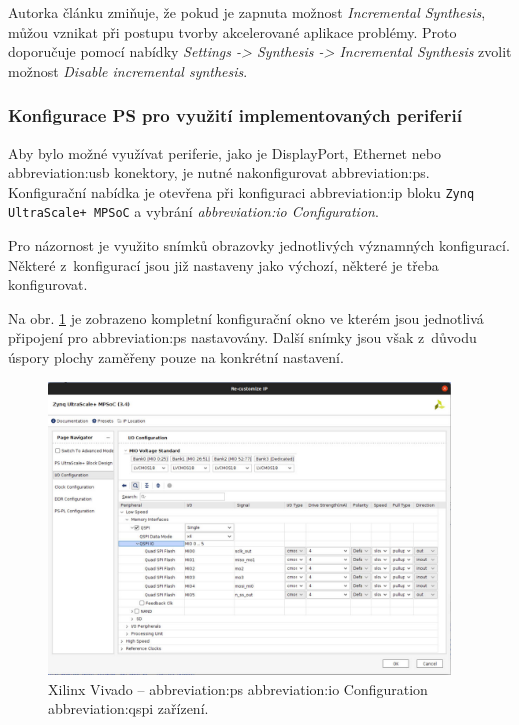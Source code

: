 \documentclass[a4paper, twoside, 11pt]{article}
\begin{document}
				Autorka článku \cite{hackster-getting-started-with-the-kria-kr260-in-vivado} zmiňuje, že pokud je zapnuta možnost \textit{Incremental Synthesis}, můžou vznikat při postupu tvorby akcelerované aplikace problémy. Proto doporučuje pomocí nabídky \textit{Settings -> Synthesis -> Incremental Synthesis} zvolit možnost \textit{Disable incremental synthesis}.\par

				\subsubsection{Konfigurace PS pro využití implementovaných periferií}
				Aby bylo možné využívat periferie, jako je DisplayPort, Ethernet nebo \gls{abbreviation:usb} konektory, je nutné nakonfigurovat \gls{abbreviation:ps}. Konfigurační nabídka je otevřena při konfiguraci \gls{abbreviation:ip} bloku \texttt{Zynq UltraScale+ MPSoC} a vybrání \textit{\gls{abbreviation:io} Configuration}.\par
				Pro názornost je využito snímků obrazovky jednotlivých významných konfigurací. Některé z~konfigurací jsou již nastaveny jako výchozí, některé je třeba konfigurovat.\par
				Na obr. \ref{fig:kr26-xilix-vivado-flow-17} je zobrazeno kompletní konfigurační okno ve kterém jsou jednotlivá připojení pro \gls{abbreviation:ps} nastavovány. Další snímky jsou však z~důvodu úspory plochy zaměřeny pouze na konkrétní nastavení.

				\begin{figure}[htbp!]
					\centering
					\includegraphics[width=0.95\textwidth]{src/png/kr26-xilinx-vivado-flow/kr26-xilix-vivado-flow-17.jpg}
					\caption{Xilinx Vivado – \gls{abbreviation:ps} \gls{abbreviation:io} Configuration \gls{abbreviation:qspi} zařízení.}
					\label{fig:kr26-xilix-vivado-flow-17}
				\end{figure}
\end{document}
